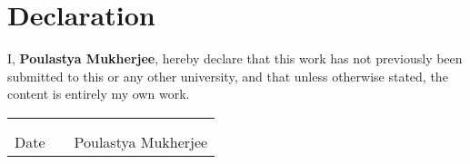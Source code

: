 \clearpage
\section*{Declaration}

\renewcommand{\arraystretch}{0.4}

\vspace{20mm}

I, \textbf{Poulastya Mukherjee}, %
hereby declare that this work has not previously been submitted to this or any other university, and that unless otherwise stated, the content is entirely my own work.


\vspace{80mm}

\begin{table}[h]
 \begin{center}
  \begin{tabular}{ccc}
   
   \hspace{30mm}  & \hspace{30mm} &  \hspace{50mm} \\
   \cline{1-1}    \cline{3-3} \\
   Date           &  & Poulastya Mukherjee\\
  \end{tabular}
 \end{center}
\end{table}

\clearpage

